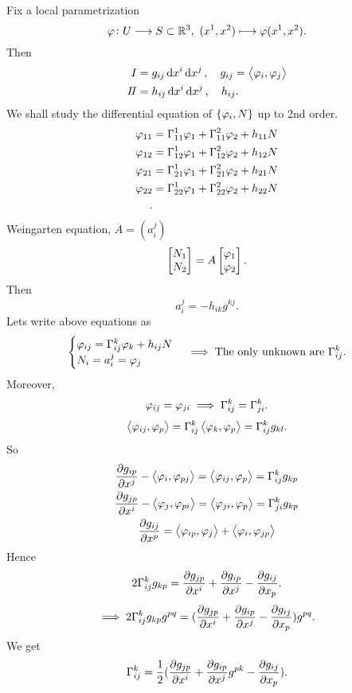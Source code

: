 Fix a local parametrization \[
    \varphi\colon U \longrightarrow S\subset \mathbb{R}^3,
    \ (x^1,x^2)\longmapsto \varphi(x^1,x^2)
.\] Then
\begin{align*}
    I&=g_{ij}\dd{x^i}\dd{x^j},\quad g_{ij}=\left<\varphi_i,\varphi_j\right> \\
    I\!I&=h_{ij}\dd{x^i}\dd{x^j},\quad h_{ij}
.\end{align*}
We shall study the differential equation of \(\{\varphi_i,N\}\) up to 2nd order.
\begin{align*}
    \varphi_{11}&=\Gamma_{11}^1\varphi_1+\Gamma_{11}^2\varphi_2+h_{11}N\\
    \varphi_{12}&=\Gamma_{12}^1\varphi_1+\Gamma_{12}^2\varphi_2+h_{12}N\\
    \varphi_{21}&=\Gamma_{21}^1\varphi_1+\Gamma_{21}^2\varphi_2+h_{21}N\\
    \varphi_{22}&=\Gamma_{22}^1\varphi_1+\Gamma_{22}^2\varphi_2+h_{22}N\\
.\end{align*}
Weingarten equation, \(A=(a_i^j)\)
\[
    \begin{bmatrix}
        N_1 \\ N_2
    \end{bmatrix}=A\begin{bmatrix}
        \varphi_1 \\ \varphi_2
    \end{bmatrix}
.\] Then \[
    a_i^j=-h_{ik}g^{kj}
.\] Lets write above equations as
\begin{equation}\label{eq:motion}
    \begin{cases}
        \varphi_{ij}=\Gamma_{ij}^k\varphi_k+h_{ij}N \\
        N_i=a_i^j=\varphi_j
    \end{cases}
    \implies \text{The only unknown are }\Gamma_{ij}^k
.\end{equation}
Moreover, \[
    \varphi_{ij}=\varphi_{ji}\implies \Gamma_{ij}^k=\Gamma_{ji}^k
.\] \[
    \left<\varphi_{ij},\varphi_p\right> =\Gamma_{ij}^k \left<\varphi_k,\varphi_p\right> 
    =\Gamma_{ij}^kg_{kl}
.\] So
\begin{gather*}
    \pdv{g_{ip}}{x^j}-\left<\varphi_i,\varphi_{pj}\right> 
    =\left<\varphi_{ij},\varphi_p\right> =\Gamma_{ij}^kg_{kp} \\
    \pdv{g_{jp}}{x^i}-\left<\varphi_j,\varphi_{pi}\right> 
    =\left<\varphi_{ji},\varphi_p\right> =\Gamma_{ji}^kg_{kp} \\
    \pdv{g_{ij}}{x^p}=\left<\varphi_{ip},\varphi_j\right>
    +\left<\varphi_i,\varphi_{jp}\right> 
\end{gather*}
Hence \[
    2\Gamma_{ij}^k g_{kp}=\pdv{g_{jp}}{x^i}+\pdv{g_{ip}}{x^j}-\pdv{g_{ij}}{x_{p}}
.\] \[
    \implies 2\Gamma_{ij}^kg_{kp}g^{pq}
    =(\pdv{g_{jp}}{x^i}+\pdv{g_{ip}}{x^j}-\pdv{g_{ij}}{x_{p}})g^{pq}
.\] We get \[
    \Gamma_{ij}^k=\frac{1}{2}(\pdv{g_{jp}}{x^i}+\pdv{g_{ip}}{x^j}g^{pk}
    -\pdv{g_{ij}}{x_{p}})
.\] 

